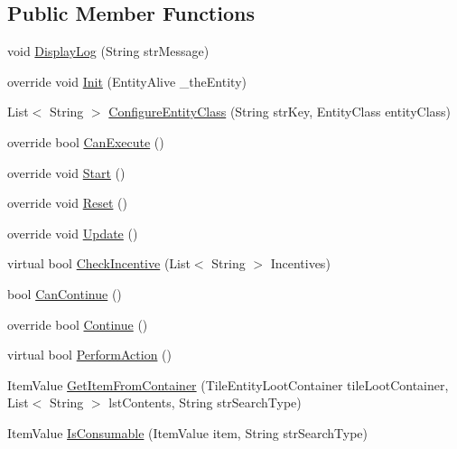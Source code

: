 \subsection*{Public Member Functions}
\begin{DoxyCompactItemize}
\item 
void \mbox{\hyperlink{class_e_a_i_maslow_level1_s_d_x_a8eea2f5bdc585012edd193f3cc2910d2}{Display\+Log}} (String str\+Message)
\item 
override void \mbox{\hyperlink{class_e_a_i_maslow_level1_s_d_x_ae672f6b8718ec477f3e978eab63fa534}{Init}} (Entity\+Alive \+\_\+the\+Entity)
\item 
List$<$ String $>$ \mbox{\hyperlink{class_e_a_i_maslow_level1_s_d_x_abb700bd226558cd1bc8d138f9390af2d}{Configure\+Entity\+Class}} (String str\+Key, Entity\+Class entity\+Class)
\item 
override bool \mbox{\hyperlink{class_e_a_i_maslow_level1_s_d_x_a4875de22593103de62decf09a07132bb}{Can\+Execute}} ()
\item 
override void \mbox{\hyperlink{class_e_a_i_maslow_level1_s_d_x_a9bb6f80930f3f77ab6dcf9018def6dbf}{Start}} ()
\item 
override void \mbox{\hyperlink{class_e_a_i_maslow_level1_s_d_x_aa5a568c21b9165e495552070af6171e6}{Reset}} ()
\item 
override void \mbox{\hyperlink{class_e_a_i_maslow_level1_s_d_x_ab42d824589397c9e9924975b62fe2a6d}{Update}} ()
\item 
virtual bool \mbox{\hyperlink{class_e_a_i_maslow_level1_s_d_x_ae3ac80dc384be929dead884d125248c2}{Check\+Incentive}} (List$<$ String $>$ Incentives)
\item 
bool \mbox{\hyperlink{class_e_a_i_maslow_level1_s_d_x_a30c55e1fa6c0fb13fa3f0e5dfa0e2d0a}{Can\+Continue}} ()
\item 
override bool \mbox{\hyperlink{class_e_a_i_maslow_level1_s_d_x_a420a147329a60a28393005ccc0efdb15}{Continue}} ()
\item 
virtual bool \mbox{\hyperlink{class_e_a_i_maslow_level1_s_d_x_a8c398da905614892da7ef62cdc941094}{Perform\+Action}} ()
\item 
Item\+Value \mbox{\hyperlink{class_e_a_i_maslow_level1_s_d_x_ae5b58b99162f636b87640eaea4bd9763}{Get\+Item\+From\+Container}} (Tile\+Entity\+Loot\+Container tile\+Loot\+Container, List$<$ String $>$ lst\+Contents, String str\+Search\+Type)
\item 
Item\+Value \mbox{\hyperlink{class_e_a_i_maslow_level1_s_d_x_a64862ccd699018e8ad815d21fdd58989}{Is\+Consumable}} (Item\+Value item, String str\+Search\+Type)

\end{DoxyCompactItemize}

